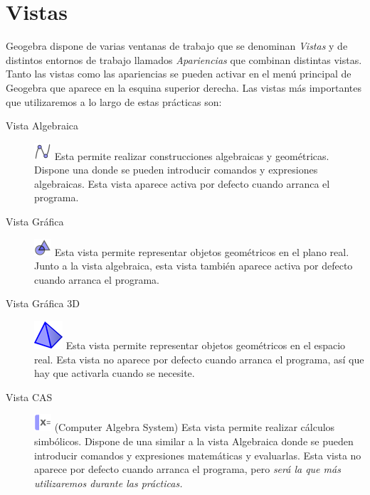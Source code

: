 \section{Vistas}
Geogebra dispone de varias ventanas de trabajo que se denominan \emph{Vistas} y de distintos entornos de trabajo llamados \emph{Apariencias} que combinan distintas vistas.
Tanto las vistas como las apariencias se pueden activar en el menú principal de Geogebra que aparece en la esquina superior derecha.
Las vistas más importantes que utilizaremos a lo largo de estas prácticas son:
\begin{description}
\item[Vista Algebraica] \includegraphics[scale=0.03]{img/introduccion/algebraic-view-icon} Esta permite realizar construcciones algebraicas y geométricas.
      Dispone una  donde se pueden introducir comandos y expresiones algebraicas.
      Esta vista aparece activa por defecto cuando arranca el programa.
\item[Vista Gráfica] \includegraphics[scale=0.03]{img/introduccion/graphics-view-icon} Esta vista permite representar objetos geométricos en el plano real.
      Junto a la vista algebraica, esta vista también aparece activa por defecto cuando arranca el programa.
\item[Vista Gráfica 3D] \includegraphics[scale=0.3]{img/introduccion/3d-graphics-view-icon} Esta vista permite representar objetos geométricos en el espacio real.
      Esta vista no aparece por defecto cuando arranca el programa, así que hay que activarla cuando se necesite.
\item[Vista CAS] \includegraphics[scale=0.03]{img/introduccion/cas-view-icon} (Computer Algebra System) Esta vista permite realizar cálculos simbólicos. Dispone de una  similar a la vista Algebraica donde se pueden introducir comandos y expresiones matemáticas y evaluarlas.
      Esta vista no aparece por defecto cuando arranca el programa, pero \emph{será la que más utilizaremos durante las prácticas.}
\end{description}


